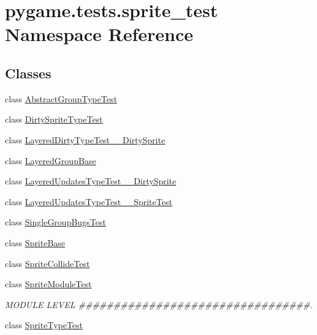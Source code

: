 \hypertarget{namespacepygame_1_1tests_1_1sprite__test}{}\section{pygame.\+tests.\+sprite\+\_\+test Namespace Reference}
\label{namespacepygame_1_1tests_1_1sprite__test}
\subsection*{Classes}
\begin{DoxyCompactItemize}
\item 
class \hyperlink{classpygame_1_1tests_1_1sprite__test_1_1_abstract_group_type_test}{Abstract\+Group\+Type\+Test}
\item 
class \hyperlink{classpygame_1_1tests_1_1sprite__test_1_1_dirty_sprite_type_test}{Dirty\+Sprite\+Type\+Test}
\item 
class \hyperlink{classpygame_1_1tests_1_1sprite__test_1_1_layered_dirty_type_test_____dirty_sprite}{Layered\+Dirty\+Type\+Test\+\_\+\+\_\+\+Dirty\+Sprite}
\item 
class \hyperlink{classpygame_1_1tests_1_1sprite__test_1_1_layered_group_base}{Layered\+Group\+Base}
\item 
class \hyperlink{classpygame_1_1tests_1_1sprite__test_1_1_layered_updates_type_test_____dirty_sprite}{Layered\+Updates\+Type\+Test\+\_\+\+\_\+\+Dirty\+Sprite}
\item 
class \hyperlink{classpygame_1_1tests_1_1sprite__test_1_1_layered_updates_type_test_____sprite_test}{Layered\+Updates\+Type\+Test\+\_\+\+\_\+\+Sprite\+Test}
\item 
class \hyperlink{classpygame_1_1tests_1_1sprite__test_1_1_single_group_bugs_test}{Single\+Group\+Bugs\+Test}
\item 
class \hyperlink{classpygame_1_1tests_1_1sprite__test_1_1_sprite_base}{Sprite\+Base}
\item 
class \hyperlink{classpygame_1_1tests_1_1sprite__test_1_1_sprite_collide_test}{Sprite\+Collide\+Test}
\item 
class \hyperlink{classpygame_1_1tests_1_1sprite__test_1_1_sprite_module_test}{Sprite\+Module\+Test}
\begin{DoxyCompactList}\small\item\em M\+O\+D\+U\+LE L\+E\+V\+EL \#\#\#\#\#\#\#\#\#\#\#\#\#\#\#\#\#\#\#\#\#\#\#\#\#\#\#\#\#\#\#\#\#. \end{DoxyCompactList}\item 
class \hyperlink{classpygame_1_1tests_1_1sprite__test_1_1_sprite_type_test}{Sprite\+Type\+Test}
\end{DoxyCompactItemize}
